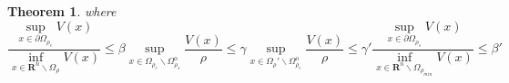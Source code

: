 \documentclass[letterpaper, 10pt, conference]{ieeeconf}
\newtheorem{thm}{Theorem}
\begin{document}
\begin{thm}
\vspace{0.5cm}
	where 
	\begin{subequations}\label{eq:beta}
		\begin{equation}\label{eq:beta1}
		\frac{\sup_{x \in \partial \Omega_{\rho_e}} V(x)}{\inf_{x \in \mathbf{R}^n \backslash \Omega_{\rho}} V(x)} \leq \beta 
		\end{equation}
		\begin{equation}\label{eq:gamma}
		\sup \limits_{x \in \Omega_{\rho_e} \backslash \Omega_{\rho_s}^{\text{o}}}	\frac{V(x)}{\rho} \leq \gamma 
		\end{equation}
		\begin{equation}\label{eq:gamma'}
		\sup \limits_{x \in \Omega_{\rho}' \backslash \Omega_{\rho_e}^\text{o}}	\frac{V(x)}{\rho} \leq \gamma'
		\end{equation}	
		\begin{equation}\label{eq:beta2}
		\frac{\sup_{x \in \partial \Omega_{\rho_s}} V(x)}{\inf_{x \in \mathbf{R}^n \backslash \Omega_{\rho_{min}}} V(x)} \leq \beta' 
		\end{equation}
	\end{subequations}
\end{thm}

\vspace{0.5cm}
\end{document}
